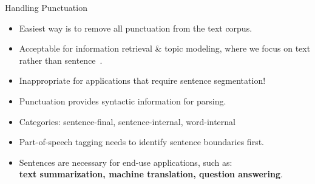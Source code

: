 \documentclass{beamer}
\renewcommand{\cite}{\citep}
\begin{document}
\begin{frame}{Handling Punctuation}
\begin{itemize}
\item Easiest way is to remove all punctuation from the text corpus.
\item Acceptable for information retrieval \& topic modeling, where we focus on text rather than sentence~\cite{korde2012text}.
\item Inappropriate for applications that require sentence segmentation!
	\bigskip
\item Punctuation provides syntactic information for parsing.
\item Categories: sentence-final, sentence-internal, word-internal
\item Part-of-speech tagging needs to identify sentence boundaries first.
\item Sentences are necessary for end-use applications, such as:\\
\textbf{text summarization, machine translation, question answering}.\\
~\cite{patil2015automatic, kim2019researching, li2001incorporating}
\end{itemize}
\end{frame}


\end{document}
